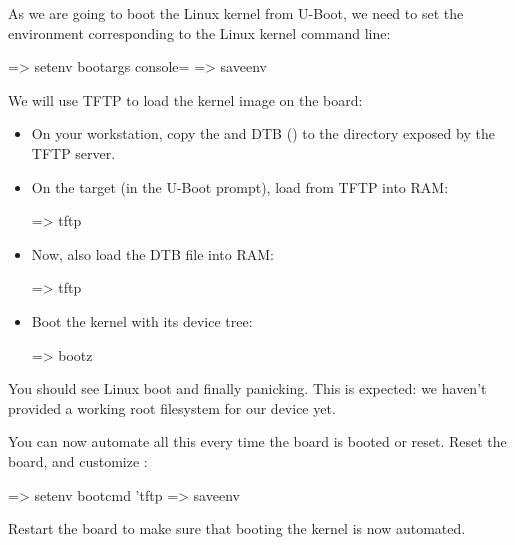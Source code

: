 As we are going to boot the Linux kernel from U-Boot,
we need to set the  environment corresponding
to the Linux kernel command line:

\begin{ubootinput}
=> setenv bootargs console=%
=> saveenv
\end{ubootinput}
We will use TFTP to load the kernel image on the board:

\begin{itemize}

\item On your workstation, copy the  and DTB
(\texttt\dtbname) to the directory exposed by the TFTP server.

\item On the target (in the U-Boot prompt), load  from
TFTP into RAM:
\begin{ubootinput}
=> tftp %
\end{ubootinput}

\item Now, also load the DTB file into RAM:
\begin{ubootinput}
=> tftp %
\end{ubootinput}

\item Boot the kernel with its device tree:
\begin{ubootinput}
=> bootz %
\end{ubootinput}

\end{itemize}

You should see Linux boot and finally panicking. This is expected: we
haven't provided a working root filesystem for our device yet.

You can now automate all this every time the board is booted or
reset. Reset the board, and customize :

\begin{ubootinput}
=> setenv bootcmd 'tftp %
=> saveenv
\end{ubootinput}

Restart the board to make sure that booting the kernel is now automated.

{

}
{}


{

}
{}



